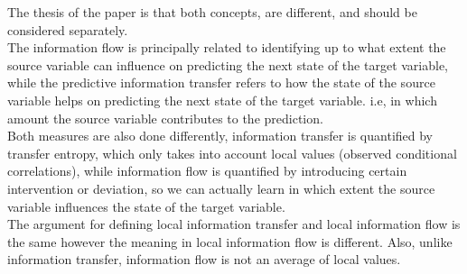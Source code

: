 \documentclass[11pt]{article}
\begin{document}
The thesis of the paper is that both concepts, are different, and should be considered separately.\\

The information flow is principally related to identifying up to what extent the source variable can influence on predicting the next state of the target variable, while the predictive information transfer refers to how the state of the source variable helps on predicting the next state of the target variable. i.e, in which amount the source variable contributes to the prediction. \\

Both measures are also done differently, information transfer is quantified by transfer entropy, which only takes into account local values (observed conditional correlations), while information flow is quantified by introducing certain intervention or deviation, so we can actually learn in which extent the source variable influences the state of the target variable.\\

The argument for defining local information transfer and local information flow is the same however the meaning in local information flow is different. Also, unlike information transfer, information flow is not an average of local values.\\




\end{document}
